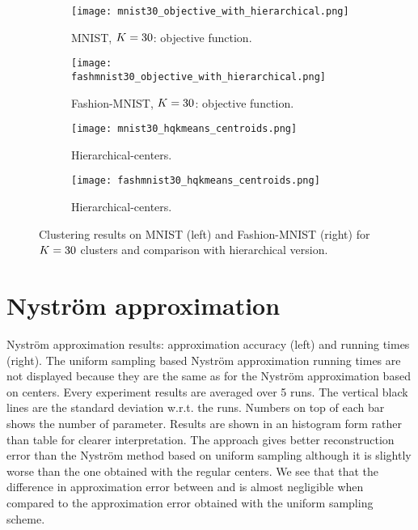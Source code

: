 \begin{figure*}[h]
\begin{subfigure}{.49\textwidth}
\texttt{[image: mnist30\_objective\_with\_hierarchical.png]}
\caption{MNIST, $K=30$: objective function.}
\label{fig:mnist:objfunhier}
\end{subfigure}
\begin{subfigure}{.49\textwidth}
\texttt{[image: fashmnist30\_objective\_with\_hierarchical.png]}
\caption{Fashion-MNIST, $K=30$: objective function.}
\label{fig:fmnist:objfunhier}
\end{subfigure}
\begin{subfigure}{.49\textwidth}
\texttt{[image: mnist30\_hqkmeans\_centroids.png]}
\caption{Hierarchical-\palm \qkmeans centers.}
\label{fig:mnist:hqkmeans:centers}
\end{subfigure}
\begin{subfigure}{.49\textwidth}
\texttt{[image: fashmnist30\_hqkmeans\_centroids.png]}
\caption{Hierarchical-\palm \qkmeans centers.}
\label{fig:fmnist:hqkmeans:centers}
\end{subfigure}
\caption{Clustering results on MNIST (left) and Fashion-MNIST (right) for $K=30$ clusters and comparison with hierarchical version.}
\end{figure*}

\FloatBarrier

\section{Nyström approximation}
\label{supp:nystrom}

Nystr\"om approximation results: approximation accuracy (left) and running times (right). The uniform sampling based Nyström approximation running times are not displayed because they are the same as for the Nyström approximation based on \kmeans centers. Every experiment results are averaged over 5 runs. The vertical black lines are the standard deviation w.r.t. the runs. Numbers on top of each bar shows the number of parameter.
Results are shown in an histogram form rather than table for clearer interpretation. The \qkmeans approach gives better reconstruction error than the Nyström method based on uniform sampling although it is slightly worse than the one obtained with the regular \kmeans centers. We see that that the difference in approximation error between \kmeans and \qkmeans is almost negligible when compared to the approximation error obtained with the uniform sampling scheme.


